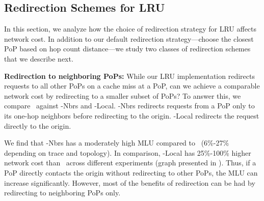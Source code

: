 \eat
{
\subsection{Redirection Schemes for LRU}


In this section, we analyze how the choice of redirection strategy for LRU affects network cost. In addition to our default redirection strategy---choose the  closest PoP based on hop count distance---we study two  classes of redirection schemes that we describe next.

\textbf{Redirection to neighboring PoPs:} While our LRU implementation redirects requests to all other PoPs on a cache miss at  a PoP, can we achieve a comparable network cost by redirecting to a smaller subset of PoPs? To answer this, we compare  \invlru\ against \textsf{\invlru-Nbrs} and \textsf{\invlru-Local}. \textsf{\invlru-Nbrs} redirects requests from a PoP only to its one-hop neighbors  before redirecting to the origin. \textsf{\invlru-Local} redirects the request directly to the origin.


We find that \textsf{\invlru-Nbrs} has a moderately high MLU compared to \invlru\ (6\%-27\% depending on trace and topology). In comparison, \textsf{\invlru-Local} has 25\%-100\% higher network cost than \invlru\ across different experiments (graph presented in \cite{techreport}).  Thus, if a PoP directly contacts the origin without redirecting to other PoPs, the MLU can  increase significantly. However, most of the benefits of  redirection can  be had by redirecting to neighboring PoPs only.
}







